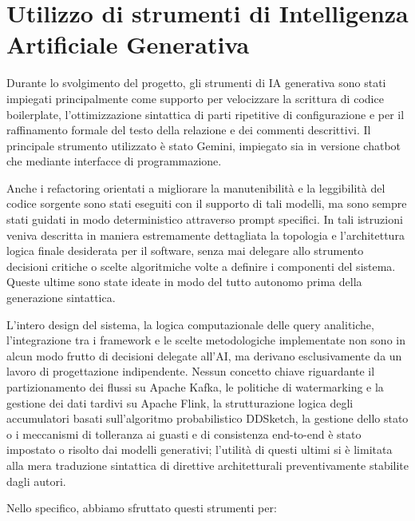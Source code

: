 \documentclass[conference]{IEEEtran}
\begin{document}
\clearpage

\appendices

\section{Utilizzo di strumenti di Intelligenza Artificiale Generativa}\label{sec:appendix_ai_declaration}

Durante lo svolgimento del progetto, gli strumenti di IA generativa sono stati impiegati principalmente come supporto per velocizzare la scrittura di codice boilerplate, l'ottimizzazione sintattica di parti ripetitive di configurazione e per il raffinamento formale del testo della relazione e dei commenti descrittivi. 
Il principale strumento utilizzato è stato Gemini, impiegato sia in versione chatbot che mediante interfacce di programmazione.

Anche i refactoring orientati a migliorare la manutenibilità e la leggibilità del codice sorgente sono stati eseguiti con il supporto di tali modelli, ma sono sempre stati guidati in modo deterministico attraverso prompt specifici. 
In tali istruzioni veniva descritta in maniera estremamente dettagliata la topologia e l'architettura logica finale desiderata per il software, senza mai delegare allo strumento decisioni critiche o scelte algoritmiche volte a definire i componenti del sistema. Queste ultime sono state ideate in modo del tutto autonomo prima della generazione sintattica.

L'intero design del sistema, la logica computazionale delle query analitiche, l'integrazione tra i framework e le scelte metodologiche implementate non sono in alcun modo frutto di decisioni delegate all'AI, ma derivano esclusivamente da un lavoro di progettazione indipendente. 
Nessun concetto chiave riguardante il partizionamento dei flussi su Apache Kafka, le politiche di watermarking e la gestione dei dati tardivi su Apache Flink, la strutturazione logica degli accumulatori basati sull'algoritmo probabilistico DDSketch, la gestione dello stato o i meccanismi di tolleranza ai guasti e di consistenza end-to-end è stato impostato o risolto dai modelli generativi; l'utilità di questi ultimi si è limitata alla mera traduzione sintattica di direttive architetturali preventivamente stabilite dagli autori.

Nello specifico, abbiamo sfruttato questi strumenti per:
\end{document}
